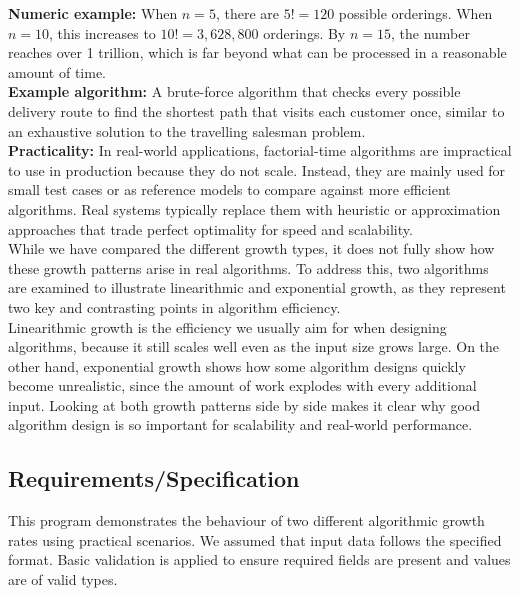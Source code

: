 \documentclass[12pt]{article}
\begin{document}
\noindent\textbf{Numeric example:}
When $n = 5$, there are $5! = 120$ possible orderings. When $n = 10$, this increases to $10! = 3,628,800$ orderings. By $n = 15$, the number reaches over 1 trillion, which is far beyond what can be processed in a reasonable amount of time.\\

\noindent\textbf{Example algorithm:}
A brute-force algorithm that checks every possible delivery route to find the shortest path that visits each customer once, similar to an exhaustive solution to the travelling salesman problem.\\

\noindent\textbf{Practicality:}
In real-world applications, factorial-time algorithms are impractical to use in
production because they do not scale. Instead, they are mainly used for small test cases or as reference models to compare against more efficient algorithms. Real systems typically replace them with heuristic or approximation approaches that trade perfect optimality for speed and scalability.\\

\medskip
While we have compared the different growth types, it does not fully show how these growth patterns arise in real algorithms. To address this, two algorithms are examined to illustrate linearithmic and exponential growth, as they represent two key and contrasting points in algorithm efficiency.\\

Linearithmic growth is the efficiency we usually aim for when designing algorithms, because it
still scales well even as the input size grows large. On the other hand, exponential growth shows
how some algorithm designs quickly become unrealistic, since the amount of work explodes with
every additional input. Looking at both growth patterns side by side makes it clear why good
algorithm design is so important for scalability and real-world performance.

\subsection{Requirements/Specification}

This program demonstrates the behaviour of two different algorithmic growth
rates using practical scenarios. We assumed that input data follows the specified format. Basic
validation is applied to ensure required fields are present and values are of valid types.
\end{document}
